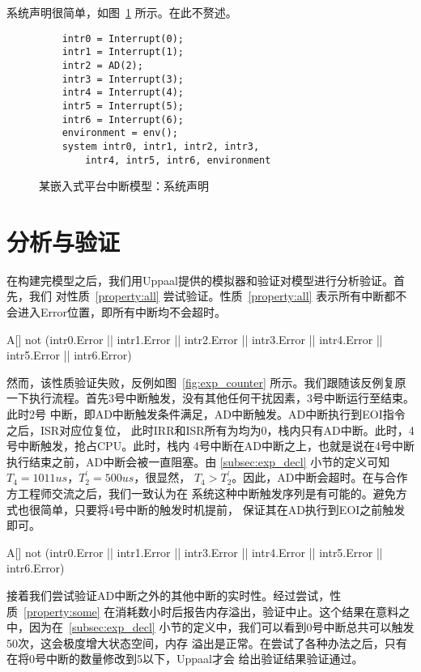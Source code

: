 系统声明很简单，如图~\ref{fig:exp_model_decl} 所示。在此不赘述。

\begin{figure}[H]
	\centering
	\begin{lstlisting}
	intr0 = Interrupt(0);
	intr1 = Interrupt(1);
	intr2 = AD(2);
	intr3 = Interrupt(3);
	intr4 = Interrupt(4);
	intr5 = Interrupt(5);
	intr6 = Interrupt(6);
	environment = env();
	system intr0, intr1, intr2, intr3, 
		intr4, intr5, intr6, environment
	\end{lstlisting}
	\caption{某嵌入式平台中断模型：系统声明}
	\label{fig:exp_model_decl}
\end{figure}

\section{分析与验证}
\label{sec:experiment}

在构建完模型之后，我们用Uppaal提供的模拟器和验证对模型进行分析验证。首先，我们
对性质~\ref{property:all} 尝试验证。性质~\ref{property:all} 表示所有中断都不
会进入Error位置，即所有中断均不会超时。

\begin{property}
	A[] not (intr0.Error || intr1.Error || intr2.Error || intr3.Error 
	|| intr4.Error || intr5.Error || intr6.Error) 
	\label{property:all}
\end{property}

然而，该性质验证失败，反例如图~\ref{fig:exp_counter} 所示。我们跟随该反例复原
一下执行流程。首先3号中断触发，没有其他任何干扰因素，3号中断运行至结束。此时2号
中断，即AD中断触发条件满足，AD中断触发。AD中断执行到EOI指令之后，ISR对应位复位，
此时IRR和ISR所有为均为0，栈内只有AD中断。此时，4号中断触发，抢占CPU。此时，栈内
4号中断在AD中断之上，也就是说在4号中断执行结束之前，AD中断会被一直阻塞。由
\ref{subsec:exp_decl} 小节的定义可知$T_4=1011us$，$T^\prime_2=500us$，很显然，
$T_4>T^\prime_2$。因此，AD中断会超时。在与合作方工程师交流之后，我们一致认为在
系统这种中断触发序列是有可能的。避免方式也很简单，只要将4号中断的触发时机提前，
保证其在AD执行到EOI之前触发即可。

\begin{property}
	A[] not (intr0.Error || intr1.Error || intr3.Error || intr4.Error || 
	intr5.Error || intr6.Error) 
	\label{property:some}
\end{property}

接着我们尝试验证AD中断之外的其他中断的实时性。经过尝试，性质~\ref{property:some}
在消耗数小时后报告内存溢出，验证中止。这个结果在意料之中，因为在~\ref{subsec:exp_decl} 
小节的定义中，我们可以看到0号中断总共可以触发50次，这会极度增大状态空间，内存
溢出是正常。在尝试了各种办法之后，只有在将0号中断的数量修改到5以下，Uppaal才会
给出验证结果\pozhehao 验证通过。

